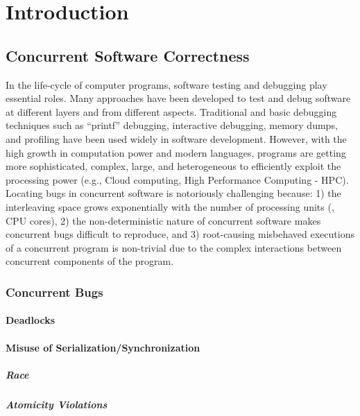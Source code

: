 
\chapter{Introduction}

\section{Concurrent Software Correctness}

In the life-cycle of computer programs, software testing and debugging play essential roles.
%
Many approaches have been developed to test and debug software at different layers and from different aspects.
%
Traditional and basic debugging techniques such as ``printf'' debugging, interactive debugging, memory dumps, and profiling have been used widely in software development.
%
%
However, with the high growth in computation power and modern languages, programs are getting more sophisticated, complex, large, and heterogeneous to efficiently exploit the processing power (e.g., Cloud computing, High Performance Computing - HPC).
%
Locating bugs in concurrent software is notoriously challenging because: 1) the interleaving space grows exponentially with the number of processing units (\eg, CPU cores), 2) the non-deterministic nature of concurrent software makes concurrent bugs difficult to reproduce, and 3) root-causing misbehaved executions of a concurrent program is non-trivial due to the complex interactions between concurrent components of the program.
%

\subsection{Concurrent Bugs}
\subsubsection{Deadlocks}
\subsubsection{Misuse of Serialization/Synchronization}
\paragraph{Race}
\paragraph{Atomicity Violations}

